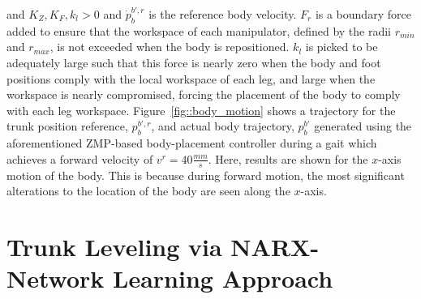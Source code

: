 		and $K_{Z}, K_{F}, k_{l} > 0$ and $\dot{p}_{b}^{b',r}$ is the reference body velocity. $F_{r}$ is a boundary force added to ensure that the workspace of each manipulator, defined by the radii $r_{min}$ and $r_{max}$, is not exceeded when the body is repositioned. $k_{l}$ is picked to be adequately large such that this force is nearly zero when the body and foot positions comply with the local workspace of each leg, and large when the workspace is nearly compromised, forcing the placement of the body to comply with each leg workspace. Figure~\ref{fig::body_motion} shows a trajectory for the trunk position reference, ${p}_{b}^{b',r}$, and actual body trajectory, ${p}_{b}^{b'}$ generated using the aforementioned ZMP-based body-placement controller during a gait which achieves a forward velocity of $v^{r}=40\frac{mm}{s}$. Here, results are shown for the $x$-axis motion of the body. This is because during forward motion, the most significant alterations to the location of the body are seen along the $x$-axis.



	\section{Trunk Leveling via NARX-Network Learning Approach}
		\label{sec::trunk_leveling_NARX}
		
